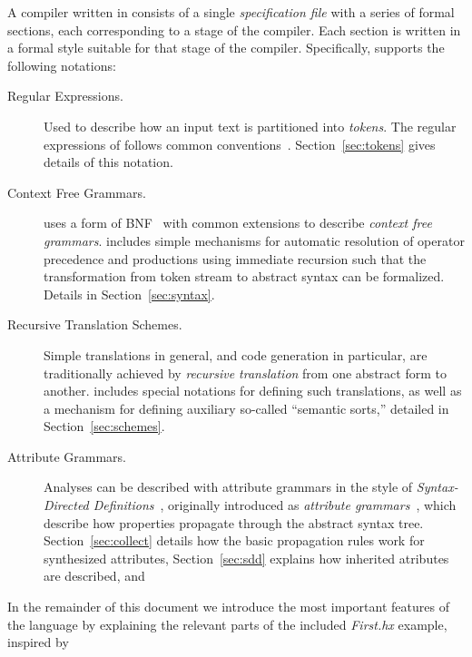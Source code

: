 \documentclass[11pt]{article} %
\begin{document}
A compiler written in \HAX consists of a single \emph{specification file} with a series of formal
sections, each corresponding to a stage of the compiler.  Each section is written in a formal style
suitable for that stage of the compiler. Specifically, \HAX supports the following notations:
\begin{description}

\item[Regular Expressions.] Used to describe how an input text is partitioned into
  \emph{tokens}. The regular expressions of \HAX follows common
  conventions~\cite{Aho+:2006}. Section~\ref{sec:tokens} gives details of this notation.

\item[Context Free Grammars.] \HAX uses a form of BNF~\cite{NaurEtal:cacm1960} with common
  extensions to describe \emph{context free grammars}. \HAX includes simple mechanisms for automatic
  resolution of operator precedence and productions using immediate recursion such that the
  transformation from token stream to abstract syntax can be formalized. Details in
  Section~\ref{sec:syntax}.

\item[Recursive Translation Schemes.] Simple translations in general, and code generation in
  particular, are traditionally achieved by \emph{recursive translation} from one abstract form to
  another.  \HAX includes special notations for defining such translations, as well as a mechanism
  for defining auxiliary so-called ``semantic sorts,'' detailed in Section~\ref{sec:schemes}.

\item[Attribute Grammars.] Analyses can be described with attribute grammars in the style of
  \emph{Syntax-Directed Definitions}~\cite{Aho+:2006}, originally introduced as \emph{attribute
    grammars}~\cite{Knuth:mst1968}, which describe how properties propagate through the abstract
  syntax tree.  Section~\ref{sec:collect} details how the basic propagation rules work for
  synthesized attributes, Section~\ref{sec:sdd} explains how inherited atributes are described, and


\end{description}
In the remainder of this document we introduce the most important features of the \HAX language by
explaining the relevant parts of the included \emph{First.hx} example, inspired by
\end{document}
